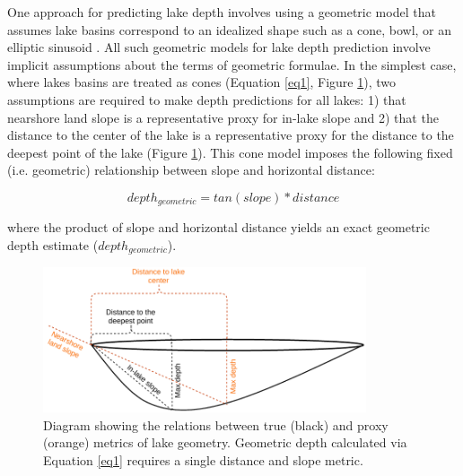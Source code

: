 \documentclass[draft]{agujournal2019}
\begin{document}
One approach for predicting lake depth involves using a geometric model that assumes lake basins correspond to an idealized shape such as a cone, bowl, or an elliptic sinusoid \cite{hollisterPredictingMaximumLake2011, neumannMaximumDepthAverage1959, yigzawNewGlobalStorage2018}. All such geometric models for lake depth prediction involve implicit assumptions about the terms of geometric formulae. In the simplest case, where lakes basins are treated as cones (Equation \ref{eq1}, Figure \ref{fig1}), two assumptions are required to make depth predictions for all lakes: 1) that nearshore land slope is a representative proxy for in-lake slope and 2) that the distance to the center of the lake is a representative proxy for the distance to the deepest point of the lake (Figure \ref{fig1}). This cone model imposes the following fixed (i.e. geometric) relationship between slope and horizontal distance:

\begin{linenomath*}
\begin{equation}
      depth_{geometric} = tan(slope) * distance \label{eq1}
\end{equation}
\end{linenomath*}

\noindent
where the product of slope and horizontal distance yields an exact geometric depth estimate ($depth_{geometric}$).

\begin{figure}
\noindent\includegraphics[width=0.85\textwidth]{../figures/slope_diagram_new}
\caption{Diagram showing the relations between true (black) and proxy (orange) metrics of lake geometry. Geometric depth calculated via Equation \ref{eq1} requires a single distance and slope metric.}\label{fig1}
\end{figure}
\end{document}
